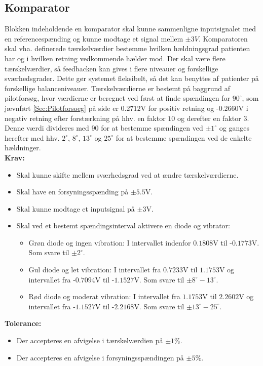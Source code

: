 \subsection{Komparator}\label{KomparatorAfs} 
Blokken indeholdende en komparator skal kunne sammenligne inputsignalet med en referencespænding og kunne modtage et signal mellem $\pm3V$. Komparatoren skal vha. definerede tærskelværdier bestemme hvilken hældningsgrad patienten har og i hvilken retning vedkommende hælder mod. Der skal være flere tærskelværdier, så feedbacken kan gives i flere niveauer og forskellige sværhedsgrader. Dette gør systemet fleksibelt, så det kan benyttes af patienter på forskellige balanceniveauer. Tærskelværdierne er bestemt på baggrund af pilotforsøg, hvor værdierne er beregnet ved først at finde spændingen for $90^{\circ}$, som jævnført \ref{Sec:Pilotforsoeg} på side \pageref{Sec:Pilotforsoeg} er $0.2712$V for positiv retning og -$0.2660$V i negativ retning efter forstærkning på hhv. en faktor $10$ og derefter en faktor $3$. Denne værdi divideres med $90$ for at bestemme spændingen ved $\pm1^{\circ}$ og ganges herefter med hhv. $2^{\circ}$,  $8^{\circ}$, $13^{\circ}$ og $25^{\circ}$ for at bestemme spændingen ved de enkelte hældninger.\\
\textbf{Krav:} 
\begin{itemize}
	\item Skal kunne skifte mellem sværhedsgrad ved at ændre tærskelværdierne.
	\item Skal have en forsyningsspænding på  $\pm5.5$V.
	\item Skal kunne modtage et inputsignal på $\pm3$V. 
	\item Skal ved et bestemt spændingsinterval aktivere en diode og vibrator:
	\begin{itemize}
		\item Grøn diode og ingen vibration: I intervallet indenfor $0.1808$V til -$0.1773$V. Som svare til $\pm2^{\circ}$.
		\item Gul diode og let vibration: I intervallet fra $0.7233$V til $1.1753$V og intervallet fra -$0.7094$V til -$1.1527$V. Som svare til $\pm 8^{\circ}-13^{\circ}$.
		\item Rød diode og moderat vibration: I intervallet fra $1.1753$V til $2.2602$V og intervallet fra -$1.1527$V til -$2.2168$V. Som svare til $\pm13^{\circ}-25^{\circ}$.
	\end{itemize}
\end{itemize}
\textbf{Tolerance:}
\begin{itemize}
	\item Der accepteres en afvigelse i tærskelværdien på $\pm1\%$.
	\item Der accepteres en afvigelse i forsyningsspændingen på $\pm5\%$.
\end{itemize}
